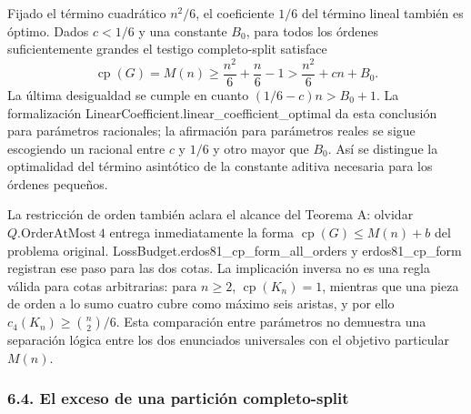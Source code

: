 \documentclass[spanish,11pt,a4paper]{article}
\begin{document}
Fijado el término cuadrático \(n^2/6\), el coeficiente \(1/6\) del término lineal también es óptimo. Dados \(c<1/6\) y una constante \(B_0\), para todos los órdenes suficientemente grandes el testigo completo-split satisface \[
\operatorname{cp}(G)=M(n)
\ge\frac{n^2}{6}+\frac n6-1
>\frac{n^2}{6}+cn+B_0.
\tag{6.5}
\] La última desigualdad se cumple en cuanto \((1/6-c)n>B_0+1\). La formalización {\ttfamily\small LinearCoeffi\discretionary{\hbox{\ensuremath{\hookrightarrow}}}{}{}cient.\discretionary{\hbox{\ensuremath{\hookrightarrow}}}{}{}linear\_\discretionary{\hbox{\ensuremath{\hookrightarrow}}}{}{}coefficient\_\discretionary{\hbox{\ensuremath{\hookrightarrow}}}{}{}optimal} da esta conclusión para parámetros racionales; la afirmación para parámetros reales se sigue escogiendo un racional entre \(c\) y \(1/6\) y otro mayor que \(B_0\). Así se distingue la optimalidad del término asintótico de la constante aditiva necesaria para los órdenes pequeños.

La restricción de orden también aclara el alcance del Teorema A: olvidar \(Q.\mathrm{OrderAtMost}\ 4\) entrega inmediatamente la forma \(\operatorname{cp}(G)\le M(n)+b\) del problema original. {\ttfamily\small LossBudget.\discretionary{\hbox{\ensuremath{\hookrightarrow}}}{}{}erdos81\_\discretionary{\hbox{\ensuremath{\hookrightarrow}}}{}{}cp\_\discretionary{\hbox{\ensuremath{\hookrightarrow}}}{}{}form\_\discretionary{\hbox{\ensuremath{\hookrightarrow}}}{}{}all\_\discretionary{\hbox{\ensuremath{\hookrightarrow}}}{}{}orders} y {\ttfamily\small erdos81\_\discretionary{\hbox{\ensuremath{\hookrightarrow}}}{}{}cp\_\discretionary{\hbox{\ensuremath{\hookrightarrow}}}{}{}form} registran ese paso para las dos cotas. La implicación inversa no es una regla válida para cotas arbitrarias: para \(n\ge2\), \(\operatorname{cp}(K_n)=1\), mientras que una pieza de orden a lo sumo cuatro cubre como máximo seis aristas, y por ello \(c_4(K_n)\ge\binom n2/6\). Esta comparación entre parámetros no demuestra una separación lógica entre los dos enunciados universales con el objetivo particular \(M(n)\).

\subsubsection{6.4. El exceso de una partición completo-split}\label{el-exceso-de-una-particion-completo-split}
\end{document}
